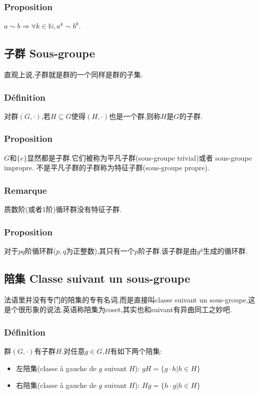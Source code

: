 \documentclass[12pt, a4paper, oneside]{ctexbook}
\begin{document}
  \subsubsection{Proposition}
  $a\sim b\Rightarrow \forall k\in \mathbb{N},a^k\sim b^k$.

  \subsection{子群 Sous-groupe}
  直观上说,子群就是群的一个同样是群的子集.
  \subsubsection{Définition}
  对群$(G,\cdot)$,若$H\subseteq G$使得$(H,\cdot)$也是一个群,则称$H$是$G$的子群.
  \subsubsection{Proposition}
  $G$和$\{e\}$显然都是子群.它们被称为平凡子群(sous-groupe trivial)或者 sous-groupe impropre.
  不是平凡子群的子群称为特征子群(sous-groupe propre).
  \subsubsection{Remarque}
  质数阶(或者1阶)循环群没有特征子群.
  \subsubsection{Proposition}
  对于$pq$阶循环群($p,q$为正整数),其只有一个$p$阶子群.该子群是由$g^q$生成的循环群.

  \subsection{陪集 Classe suivant un sous-groupe}
  法语里并没有专门的陪集的专有名词,而是直接叫classe suivant un sous-groupe,这是个很形象的说法.英语称陪集为coset,其实也和suivant有异曲同工之妙吧.
  \subsubsection{Définition}
  群$(G,\cdot)$有子群$H$.对任意$g\in G$,$H$有如下两个陪集:
  \begin{itemize}
    \item 左陪集(classe à gauche de $g$ suivant $H$): $gH=\{g\cdot h|h\in H\}$
    \item 右陪集(classe à gauche de $g$ suivant $H$): $Hg=\{h\cdot g|h\in H\}$
  \end{itemize}
\end{document}
